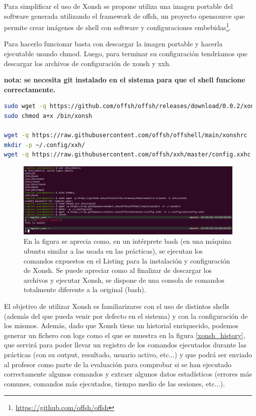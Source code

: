Para simplificar el uso de Xonsh se propone utiliza una imagen portable del software generada utilizando el framework de offsh, un proyecto opensource que permite crear imágenes de shell con software y configuraciones embebidas\footnote{\url{https://github.com/offsh/offsh}}.

Para hacerlo funcionar basta con descargar la imagen portable y hacerla ejecutable usando chmod. Luego, para terminar su configuración tendríamos que descargar los archivos de configuración de xonsh y xxh.

\textbf{nota: se necesita git instalado en el sistema para que el shell funcione correctamente.}


\begin{lstlisting}[language=bash,caption={Install xonsh using offshell appimage}, label=installxonsh]
sudo wget -q https://github.com/offsh/offsh/releases/download/0.0.2/xonsh -O /bin/xonsh
sudo chmod a+x /bin/xonsh

wget -q https://raw.githubusercontent.com/offsh/offshell/main/xonshrc -O ~/.xonshrc
mkdir -p ~/.config/xxh/
wget -q https://raw.githubusercontent.com/offsh/xxh/master/config.xxhc -O ~/.config/xxh/config.xxhc
\end{lstlisting}

\begin{figure}[pbth]
  \centering
  \includegraphics[width=\textwidth]{imagenes/installxonsh.png}
  \caption{En la figura se aprecia como, en un intérprete bash (en una máquina ubuntu similar a las usada en las prácticas), se ejecutan los comandos expuestos en el Listing \cite{installxonsh} para la instalación y configuración de Xonsh. Se puede apreciar como al finalizar de descargar los archivos y ejecutar Xonsh, se dispone de una consola de comandos totalmente diferente a la original (bash).}
  \label{xonsh_install}
\end{figure}

El objetivo de utilizar Xonsh es familiarizarse con el uso de distintos shells (además del que pueda venir por defecto en el sistema) y con la configuración de los mismos. Además, dado que Xonsh tiene un historial enriquecido, podemos generar un fichero con logs como el que se muestra en la figura \ref{xonsh_history}, que servirá para poder llevar un registro de los comandos ejecutados durante las prácticas (con su output, resultado, usuario activo, etc...) y que podrá ser enviado al profesor como parte de la evaluación para comprobar si se han ejecutado correctamente algunos comandos y extraer algunos datos estadísticos (errores más comunes, comandos más ejecutados, tiempo medio de las sesiones, etc...).

